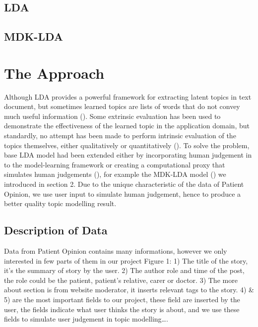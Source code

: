 \documentclass[11pt,twoside]{report}
\begin{document}
\section{LDA}

\section{MDK-LDA}

\chapter{The Approach}

Although LDA provides a powerful framework for extracting latent topics in text document, but sometimes learned topics are lists of words that do not convey much useful information (\cite{ref26}). Some extrinsic evaluation has been used to demonstrate the effectiveness of the learned topic in the application domain, but standardly, no attempt has been made to perform intrinsic evaluation of the topics themselves, either qualitatively or quantitatively (\cite{ref27}). To solve the problem, base LDA model had been extended either by incorporating human judgement in to the model-learning framework or creating a computational proxy that simulates human judgements (\cite{ref28}), for example the MDK-LDA model (\cite{ref24}) we introduced in section 2.
Due to the unique characteristic of the data of Patient Opinion, we use user input to simulate human judgement, hence to produce a better quality topic modelling result.

\section{Description of Data}

Data from Patient Opinion contains many informations, however we only interested in few parts of them in our project Figure 1: 1) The title of the story, it’s the summary of story by the user. 2) The author role and time of the post, the role could be the patient, patient’s relative, carer or doctor. 3) The more about section is from website moderator, it inserts relevant tags to the story. 4) \& 5) are the most important fields to our project, these field are inserted by the user, the fields indicate what user thinks the story is about, and we use these fields to simulate user judgement in topic modelling….
\end{document}
